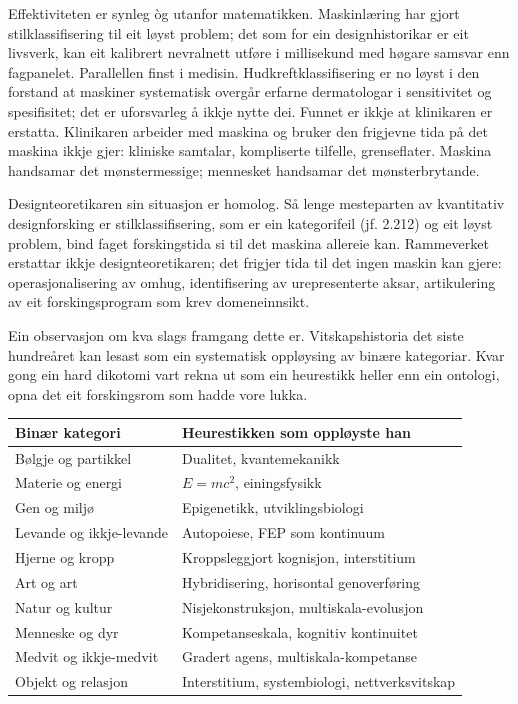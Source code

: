 \begin{widebody}
{Effektiviteten er synleg òg utanfor matematikken. Maskinlæring har gjort stilklassifisering til eit løyst problem; det som for ein designhistorikar er eit livsverk, kan eit kalibrert nevralnett utføre i millisekund med høgare samsvar enn fagpanelet. Parallellen finst i medisin. Hudkreftklassifisering er no løyst i den forstand at maskiner systematisk overgår erfarne dermatologar i sensitivitet og spesifisitet; det er uforsvarleg å ikkje nytte dei. Funnet er ikkje at klinikaren er erstatta. Klinikaren arbeider med maskina og bruker den frigjevne tida på det maskina ikkje gjer: kliniske samtalar, kompliserte tilfelle, grenseflater. Maskina handsamar det mønstermessige; mennesket handsamar det mønsterbrytande.

Designteoretikaren sin situasjon er homolog. Så lenge mesteparten av kvantitativ designforsking er stilklassifisering, som er ein kategorifeil (jf. 2.212) og eit løyst problem, bind faget forskingstida si til det maskina allereie kan. Rammeverket erstattar ikkje designteoretikaren; det frigjer tida til det ingen maskin kan gjere: operasjonalisering av omhug, identifisering av urepresenterte aksar, artikulering av eit forskingsprogram som krev domeneinnsikt.

Ein observasjon om kva slags framgang dette er. Vitskapshistoria det siste hundreåret kan lesast som ein systematisk oppløysing av binære kategoriar. Kvar gong ein hard dikotomi vart rekna ut som ein heurestikk heller enn ein ontologi, opna det eit forskingsrom som hadde vore lukka.

\begin{center}
\footnotesize
\setlength{\tabcolsep}{5pt}
\renewcommand{\arraystretch}{1.4}
\begin{tabular}{@{}p{42mm}p{56mm}@{}}
\toprule
\textbf{Binær kategori} & \textbf{Heurestikken som oppløyste han} \\
\midrule
Bølgje og partikkel & Dualitet, kvantemekanikk \\
Materie og energi & $E=mc^2$, einingsfysikk \\
Gen og miljø & Epigenetikk, utviklingsbiologi \\
Levande og ikkje-levande & Autopoiese, FEP som kontinuum \\
Hjerne og kropp & Kroppsleggjort kognisjon, interstitium \\
Art og art & Hybridisering, horisontal genoverføring \\
Natur og kultur & Nisjekonstruksjon, multiskala-evolusjon \\
Menneske og dyr & Kompetanseskala, kognitiv kontinuitet \\
Medvit og ikkje-medvit & Gradert agens, multiskala-kompetanse \\
Objekt og relasjon & Interstitium, systembiologi, nettverksvitskap \\
\bottomrule
\end{tabular}
\end{center}

}
\end{widebody}
